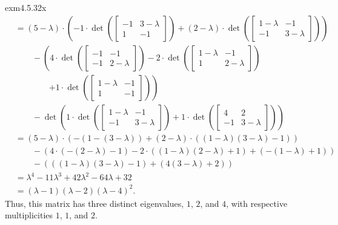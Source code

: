 \begin{exm}{}{exm4.5.32x}
{\begin{equation*}
\begin{split}
			& =(5-\lambda)\cdot \left( -1\cdot \det \left( \begin{bmatrix}-1 & 3-\lambda \\ 1 & -1\end{bmatrix}\right) +(2-\lambda )\cdot \det \left( \begin{bmatrix}1-\lambda & -1 \\ -1 & 3-\lambda\end{bmatrix}\right) \right) \\ & \qquad -\left( 4\cdot \det \left( \begin{bmatrix}-1 & -1 \\ -1 & 2-\lambda \end{bmatrix}\right) -2\cdot \det \left( \begin{bmatrix}1-\lambda & -1 \\ 1 & 2-\lambda \end{bmatrix}\right) \right. \\ & \qquad \qquad \left. +1\cdot \det \left( \begin{bmatrix}1-\lambda & -1 \\ 1 & -1\end{bmatrix}\right) \right) \\ & \qquad -\det \left( 1\cdot \det \left( \begin{bmatrix}1-\lambda & -1 \\ -1 & 3-\lambda \end{bmatrix}\right) +1\cdot \det \left( \begin{bmatrix}4 & 2 \\ -1 & 3-\lambda \end{bmatrix}\right) \right) \\
			& =(5-\lambda) \cdot \left( -(1-(3-\lambda ))+(2-\lambda )\cdot ((1-\lambda )(3-\lambda )-1)\right) \\ & \qquad -\left( 4\cdot (-(2-\lambda )-1)-2\cdot ((1-\lambda )(2-\lambda )+1)+(-(1-\lambda )+1)\right) \\ & \qquad -\left( ((1-\lambda )(3-\lambda )-1)+(4(3-\lambda )+2)\right) \\
			& =\lambda ^4-11\lambda ^3+42\lambda ^2-64\lambda +32 \\
			& =(\lambda -1)(\lambda -2)(\lambda -4)^2.
		\end{split}
	\end{equation*}
	}
	Thus, this matrix has three distinct eigenvalues, $1$, $2$, and $4$, with respective multiplicities $1$, $1$, and $2$.
\end{exm}

